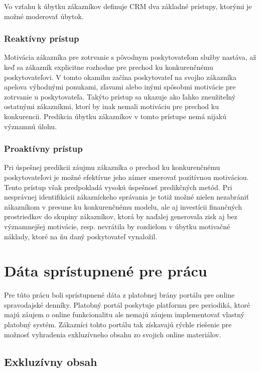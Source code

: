 Vo vzťahu k úbytku zákazníkov definuje CRM dva základné prístupy, ktorými je možné moderovať úbytok. 

\subsubsection{Reaktívny prístup}
\label{analyza_reaktivny_pristup}

Motivácia zákazníka pre zotrvanie s pôvodnym poskytovateľom služby nastáva, až keď sa zákazník explicitne rozhodne pre prechod ku konkurenčnému poskytovateľovi. V tomto okamihu začína poskytovateľ na svojho zákazníka apelova výhodnými ponukami, zľavami alebo inými spôsobmi motivácie pre zotrvanie u poskytovateľa. Takýto prístup sa ukazuje ako ľahko zneužiteľný ostatnými zákazníkmi, ktorí by inak nemali motiváciu pre prechod ku konkurencii. Predikcia úbytku zákazníkov v tomto prístupe nemá nijakú významnú úlohu.

\subsubsection{Proaktívny prístup}
\label{analyza_proaktivny_pristup}

Pri úspešnej predikcii záujmu zákazníka o prechod ku konkurenčnému poskytovateľovi je možné efektívne jeho zámer smerovať pozitívnou motiváciou. Tento prístup však predpokladá vysokú úspešnosť predikčných metód. Pri nesprávnej identifikácii zákazníckeho správania je totiž možné nielen nezabrániť zákazníkom v presune ku konkurenčnému modelu, ale aj investícii finančných prostriedkov do skupiny zákazníkov, ktorá by naďalej generovala zisk aj bez významnejšej motivácie, resp. nevrátila by rozdielom v úbytku motivačné náklady, ktoré na ňu daný poskytovateľ vynaložil.

\section{Dáta sprístupnené pre prácu}
\label{analyza_data}

Pre túto prácu boli sprístupnené dáta z platobnej brány portálu pre online spravodajské denníky. Platobný portál poskytuje platformu pre periodiká, ktoré majú záujem o online funkcionalitu ale nemajú záujem implementovať vlastný platobný systém. Zákazníci tohto portálu tak získavajú rýchle riešenie pre možnosť vyhradenia exkluzívneho obsahu zo svojich online materiálov.

\subsection{Exkluzívny obsah}
\label{analyza_exkluzivny_obsah}


